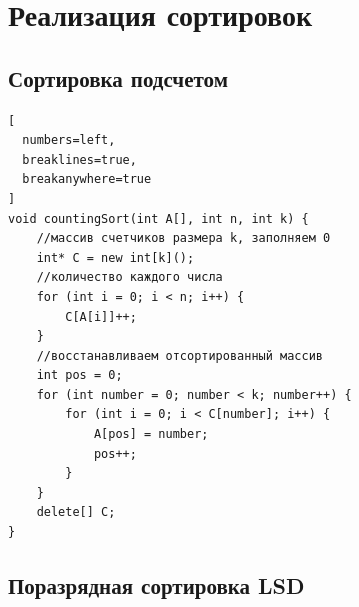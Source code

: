 \documentclass[otchet]{SCWorks}
\begin{document}

\date{2026}

\maketitle

\secNumbering

\tableofcontents




\section{Реализация сортировок}
\subsection{Сортировка подсчетом}
\begin{Verbatim}[
  numbers=left,
  breaklines=true,
  breakanywhere=true
]
void countingSort(int A[], int n, int k) {
    //массив счетчиков размера k, заполняем 0
    int* C = new int[k]();
    //количество каждого числа
    for (int i = 0; i < n; i++) {
        C[A[i]]++;
    }
    //восстанавливаем отсортированный массив
    int pos = 0;
    for (int number = 0; number < k; number++) {
        for (int i = 0; i < C[number]; i++) {
            A[pos] = number;
            pos++;
        }
    }
    delete[] C;
}
\end{Verbatim}

\subsection{Поразрядная сортировка LSD}
\end{document}
